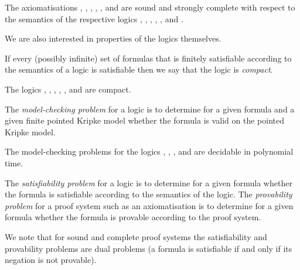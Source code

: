\begin{proposition}
The axiomatisations \axiomK{}, \axiomKF{}, \axiomKFF{}, \axiomKD{}, \axiomSF{}, and \axiomS{} are sound and strongly complete with respect to the semantics of the respective logics \logicK{}, \logicKF{}, \logicKFF{}, \logicKD{}, \logicSF{}, and \logicS{}.
\end{proposition}


We are also interested in properties of the logics themselves.

\begin{definition}[Compactness]
If every (possibly infinite) set of formulas that is finitely satisfiable according to the semantics of a logic is satisfiable then we say that the logic is {\em compact}.
\end{definition}

\begin{proposition}
The logics \logicK{}, \logicKF{}, \logicKFF{}, \logicKD{}, \logicSF{}, and \logicS{} are compact.
\end{proposition}


\begin{definition}
The {\em model-checking problem} for a logic is to determine for a given formula and a given finite pointed Kripke model whether the formula is valid on the pointed Kripke model.
\end{definition}

\begin{proposition}
The model-checking problems for the logics \logicK{}, \logicKF{}, \logicKFF{}, \logicKD{} and \logicS{} are decidable in polynomial time.
\end{proposition}


\begin{definition}
The {\em satisfiability problem} for a logic is to determine for a given formula whether the formula is satisfiable according to the semantics of the logic.
The {\em provability problem} for a proof system such as an axiomatisation is to determine for a given formula whether the formula is provable according to the proof system.
\end{definition}

We note that for sound and complete proof systems the satisfiability and provability problems are dual problems (a formula is satisfiable if and only if its negation is not provable).

